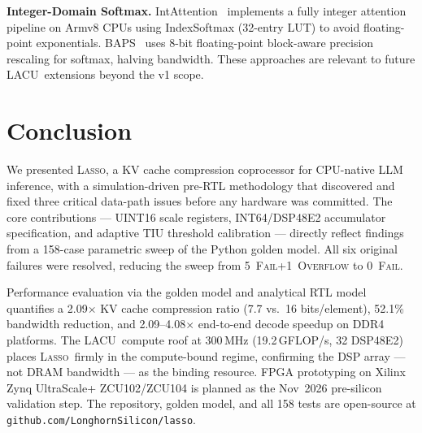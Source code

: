 \documentclass[conference]{IEEEtran}
\newcommand{\lasso}{\textsc{Lasso}}
\newcommand{\lacu}{\textsc{LACU}}
\begin{document}
\textbf{Integer-Domain Softmax.}
IntAttention~\cite{intattention2025} implements a fully integer attention
pipeline on Armv8 CPUs using IndexSoftmax (32-entry LUT) to avoid
floating-point exponentials. BAPS~\cite{baps2026} uses 8-bit
floating-point block-aware precision rescaling for softmax, halving
bandwidth. These approaches are relevant to future \lacu\ extensions
beyond the v1 scope.

\section{Conclusion}
\label{sec:conclusion}

We presented \lasso, a KV cache compression coprocessor for CPU-native
LLM inference, with a simulation-driven pre-RTL methodology that
discovered and fixed three critical data-path issues before any
hardware was committed. The core contributions --- UINT16 scale
registers, INT64/DSP48E2 accumulator specification, and adaptive TIU
threshold calibration --- directly reflect findings from a 158-case
parametric sweep of the Python golden model. All six original failures
were resolved, reducing the sweep from 5~\textsc{Fail}+1~\textsc{Overflow}
to 0~\textsc{Fail}.

Performance evaluation via the golden model and analytical RTL model
quantifies a 2.09$\times$ KV cache compression ratio (7.7
vs.\ 16 bits/element), 52.1\% bandwidth reduction, and 2.09--4.08$\times$
end-to-end decode speedup on DDR4 platforms.  The \lacu\ compute roof
at 300\,MHz (19.2\,GFLOP/s, 32 DSP48E2) places \lasso\ firmly in the
compute-bound regime, confirming the DSP array --- not DRAM bandwidth ---
as the binding resource.  FPGA prototyping on Xilinx Zynq UltraScale+
ZCU102/ZCU104 is planned as the Nov~2026 pre-silicon validation step.
The repository, golden model, and all 158 tests are open-source at
\texttt{github.com/LonghornSilicon/lasso}.

%


\end{document}
